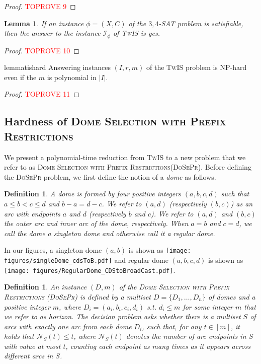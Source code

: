 \documentclass[letterpaper,11pt]{article}
\newtheorem{lemma}[theorem]{Lemma}
\newtheorem{definition}[theorem]{Definition}
\newcommand{\sssattt}{\textsc{$3,4$-SAT}\xspace}
\newcommand{\tis}{\textsc{TwIS}\xspace}
\newcommand{\dspr}{\textsc{DoSePr}\xspace}
\newcommand{\dsprlong}{\textsc{Dome Selection with Prefix Restrictions}\xspace}
\begin{document}
\begin{proof}\textcolor{red}{TOPROVE 9}\end{proof}

\begin{lemma} \label{lemma1_SATtoTIS}
If an instance $\phi=(X,C)$ of the \sssattt problem is satisfiable, then the answer to the instance $\mathcal{I}_\phi$ of \tis is yes.
\end{lemma}

\begin{proof}\textcolor{red}{TOPROVE 10}\end{proof}



\begin{restatable}{lemma}{tishard}\label{thm:1}
Answering instances $(I,r,m)$ of the \tis problem is NP-hard even if the $m$ is polynomial in $|I|$. 
\end{restatable}

\begin{proof}\textcolor{red}{TOPROVE 11}\end{proof}



  \subsection{Hardness of \dsprlong}\label{subsec:hardness:dspr}
We present a polynomial-time reduction from \tis to a new problem that we refer to as \dsprlong (\dspr).
Before defining the \dspr problem, we first define the notion of a \emph{dome} as follows.

\begin{definition}
    A \emph{dome} is formed by four positive integers $(a,b,c,d)$ such that $a \leq b < c \leq d$ and $b-a=d-c$. We refer to $(a,d)$ (respectively $(b,c)$) as an \emph{arc} with endpoints $a$ and $d$ (respectively $b$ and $c$). We refer to $(a,d)$ and $(b,c)$ the \emph{outer arc} and \emph{inner arc} of the dome, respectively. When $a=b$ and $c=d$, we call the dome a \emph{singleton dome} and otherwise call it a \emph{regular dome}.
\end{definition}

 In our figures, a singleton dome $(a,b)$ is shown as \texttt{[image: figures/singleDome\_cdsToB.pdf]} and regular dome $(a,b,c,d)$ is shown as \texttt{[image: figures/RegularDome\_CDStoBroadCast.pdf]}. 


\begin{definition}
    An instance $(D,m)$ of the \emph{\dsprlong} (\dspr) is defined by a multiset $D= \{D_1,\ldots, D_n\}$ of domes and a positive integer $m$, where $D_i = (a_i,b_i,c_i,d_i)$ s.t. $d_i \leq m$ for some integer $m$ that we refer to as \emph{horizon}. The decision problem asks whether there is a multiset $S$ of arcs with exactly one arc from each dome $D_i$, such that, for any $t \in [m]$, it holds that $\mathcal{N}_S(t) \leq t$, where $\mathcal{N}_S(t)$ denotes the number of arc endpoints in $S$ with value at most $t$, counting each endpoint as many times as it appears across different arcs in $S$.
\end{definition}
\end{document}
